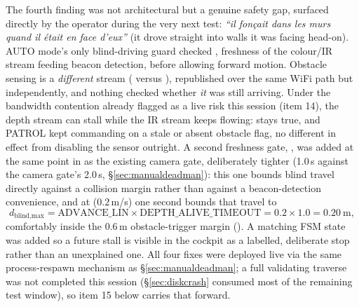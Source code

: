 The fourth finding was not architectural but a genuine safety gap,
surfaced directly by the operator during the very next test:
\emph{``il fonçait dans les murs quand il était en face d'eux''}
(it drove straight into walls it was facing head-on). AUTO mode's only
blind-driving guard checked , freshness of the colour/IR
stream feeding beacon detection, before allowing forward motion. Obstacle
sensing is a \emph{different} stream ( versus
), republished over the same WiFi path but
independently, and nothing checked whether \emph{it} was still arriving.
Under the bandwidth contention already flagged as a live risk this session
(item 14), the depth stream can stall while the IR stream keeps flowing:
 stays true, and PATROL kept commanding
 on a stale or absent obstacle flag, no different in
effect from disabling the sensor outright. A second freshness gate,
, was added at the same point in
 as the existing camera gate, deliberately tighter
(1.0\,s against the camera gate's 2.0\,s, \S\ref{sec:manualdeadman}):
this one bounds blind travel directly against a collision margin rather
than against a beacon-detection convenience, and at
 ($0.2$\,m/s) one second bounds that travel to
\begin{equation}
d_{\text{blind,max}} = \text{ADVANCE\_LIN} \times \text{DEPTH\_ALIVE\_TIMEOUT} = 0.2 \times 1.0 = 0.20\ \text{m},
\end{equation}
comfortably inside the $0.6$\,m obstacle-trigger margin (). A
matching  FSM state was added so a future stall is
visible in the cockpit as a labelled, deliberate stop rather than an
unexplained one. All four fixes were deployed live via the same
process-respawn mechanism as \S\ref{sec:manualdeadman}; a full validating
traverse was not completed this session (\S\ref{sec:diskcrash} consumed
most of the remaining test window), so item 15 below carries that forward.

